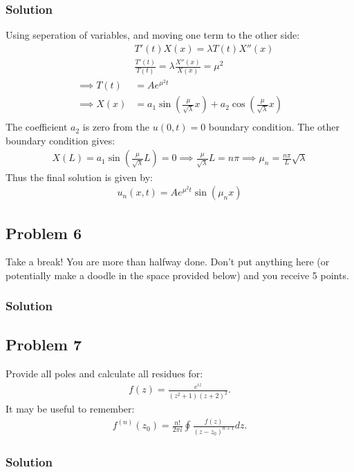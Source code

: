 \subsubsection*{Solution}
Using seperation of variables, and moving one term to the other side:
\begin{align*}
    &T'(t)X(x) = \lambda T(t)X''(x)\\
    &\frac{T'(t)}{T(t)} = \lambda \frac{X''(x)}{X(x)} = \mu^2\\
    \implies T(t) &= Ae^{\mu^2 t}\\
    \implies X(x) &= a_1\sin\left(\frac{\mu}{\sqrt{\lambda}} x\right) + a_2\cos\left(\frac{\mu}{\sqrt{\lambda}} x\right)\\
\end{align*}The coefficient $a_2$ is zero from the $u(0,t) = 0$ boundary condition. The other boundary condition gives:
\begin{align*}
    X(L) = a_1\sin\left(\frac{\mu}{\sqrt{\lambda}} L\right) = 0\implies \frac{\mu}{\sqrt{\lambda}}L = n\pi\implies \mu_n = \frac{n\pi}{L}\sqrt{\lambda}
\end{align*}Thus the final solution is given by:
\begin{align*}
    u_n(x,t) = Ae^{\mu^2t}\sin\left(\mu_nx\right)
\end{align*}
\subsection*{Problem 6}
Take a break! You are more than halfway done. Don't put anything here (or potentially make a doodle in the space provided below) and you receive 5 points.

\subsubsection*{Solution}

\subsection*{Problem 7}
Provide all poles and calculate all residues for:
\begin{align*}
    f(z) = \frac{e^{iz}}{(z^2 + 1)(z+2)^2}.
\end{align*}It may be useful to remember:
\begin{align*}
    f^{(n)}(z_0) = \frac{n!}{2\pi i}\oint \frac{f(z)}{(z -z_0)^{n+1}}dz.
\end{align*}

\subsubsection*{Solution}

